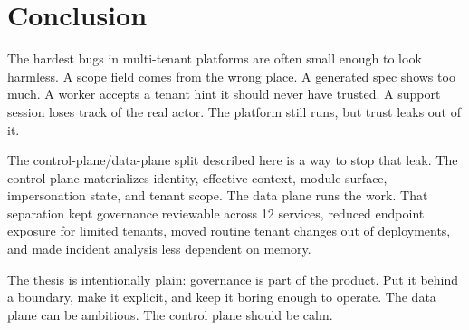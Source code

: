 \section{Conclusion}
\label{sec:conclusion}

The hardest bugs in multi-tenant platforms are often small enough to look harmless. A scope field comes from the wrong place. A generated spec shows too much. A worker accepts a tenant hint it should never have trusted. A support session loses track of the real actor. The platform still runs, but trust leaks out of it.

The control-plane/data-plane split described here is a way to stop that leak. The control plane materializes identity, effective context, module surface, impersonation state, and tenant scope. The data plane runs the work. That separation kept governance reviewable across 12 services, reduced endpoint exposure for limited tenants, moved routine tenant changes out of deployments, and made incident analysis less dependent on memory.

The thesis is intentionally plain: governance is part of the product. Put it behind a boundary, make it explicit, and keep it boring enough to operate. The data plane can be ambitious. The control plane should be calm.
